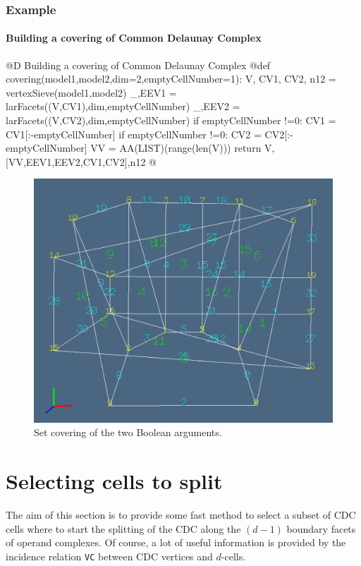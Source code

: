 \documentclass[11pt,oneside]{article}	%
\begin{document}
\subsubsection{Example}

\paragraph{Building a covering of Common Delaunay Complex}

@D Building a covering of Common Delaunay Complex
@{def covering(model1,model2,dim=2,emptyCellNumber=1):
	V, CV1, CV2, n12 = vertexSieve(model1,model2)
	_,EEV1 = larFacets((V,CV1),dim,emptyCellNumber)
	_,EEV2 = larFacets((V,CV2),dim,emptyCellNumber)
	if emptyCellNumber !=0: CV1 = CV1[:-emptyCellNumber]
	if emptyCellNumber !=0: CV2 = CV2[:-emptyCellNumber]
	VV = AA(LIST)(range(len(V)))
	return V,[VV,EEV1,EEV2,CV1,CV2],n12
@}

\begin{figure}[htbp] %
   \centering
   \includegraphics[width=0.6\linewidth]{images/covering} 
   \caption{Set covering of the two Boolean arguments.}
   \label{fig:example}
\end{figure}




\section{Selecting cells to split}

The aim of this section is to provide some fast method to select a subset of CDC cells where to start the 
splitting of the CDC along the $(d-1)$ boundary facets of operand complexes. Of course,  a lot of useful information is provided  by the incidence relation \texttt{VC} between CDC vertices and $d$-cells. 
\end{document}
